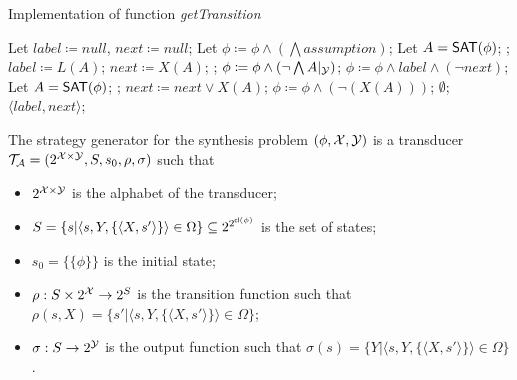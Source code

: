 \begin{algorithm}
\caption{Implementation of function \emph{getTransition}}
	\begin{algorithmic}[1]
	
	\STATE Let $label\coloneqq null$, $next \coloneqq null$;
	\STATE Let $\phi\coloneqq \phi\wedge\left(\bigwedge assumption\right)$;
    	\STATE Let $A = \textsf{SAT} (\phi)$;
    		\BREAK;
    	\ENDIF
        	\STATE $label\coloneqq L(A)$;
        	\STATE $next\coloneqq X(A)$;
        	\BREAK;
    	\ENDIF
    	\STATE $\phi\coloneqq \phi\wedge\left(\neg\bigwedge A|_{\mathcal{Y}}\right)$;
	\ENDWHILE
	\STATE $\phi\coloneqq \phi\wedge label\wedge(\neg next)$;
    	\STATE Let $A = \textsf{SAT}(\phi)$;
    		\BREAK;
    	\ENDIF
    	\STATE $next\coloneqq next\vee X(A)$;
    	\STATE $\phi\coloneqq \phi\wedge(\neg (X(A)))$;
	\ENDWHILE
		\RETURN $\emptyset$;
	\ENDIF
	\RETURN $\langle label,next\rangle$;
	\end{algorithmic}
\end{algorithm}

\begin{definition}\label{def:transducer}
	The strategy generator for the \ltlf synthesis problem $(\phi, \mathcal{X}, \mathcal{Y})$ is a transducer $\mathcal{T}_{\mathcal{A}}=(2^{\mathcal{X}\times\mathcal{Y}}, S, s_0, \rho, \sigma)$ such that
	\begin{itemize}
		\item $2^{\mathcal{X}\times\mathcal{Y}}$ is the alphabet of the transducer;
		\item $S = \{s| \langle s, Y, \{\langle X, s'\rangle\}\rangle \in\Omega\}\subseteq 2^{2^{{\sf cl}(\phi)}}$ is the set of states;
		\item $s_0 = \{\{\phi\}\}$ is the initial state;
		\item $\rho: S\times 2^{\mathcal{X}}\rightarrow 2^S$ is the transition function such that $\rho (s, X) = \{s' | \langle s, Y, \{\langle X, s'\rangle\}\rangle\in \Omega\}$;
		\item $\sigma: S\rightarrow 2^{\mathcal{Y}}$ is the output function such that $\sigma(s)=\{Y | \langle s, Y, \{\langle X, s'\rangle\}\rangle \in \Omega\}$.
	\end{itemize}
\end{definition}

